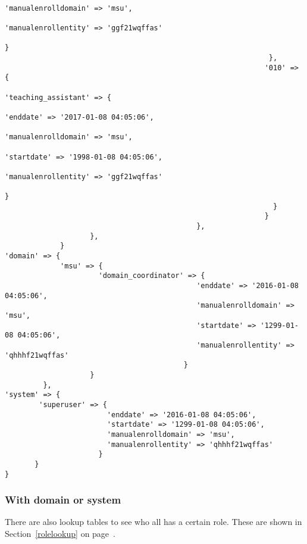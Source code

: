 \begin{verbatim}
                                                                  'manualenrolldomain' => 'msu',
                                                                  'manualenrollentity' => 'ggf21wqffas'
                                                                      }
                                                              },
                                                             '010' => {
                                                                'teaching_assistant' => {
                                                                  'enddate' => '2017-01-08 04:05:06',
                                                                  'manualenrolldomain' => 'msu',
                                                                  'startdate' => '1998-01-08 04:05:06',
                                                                  'manualenrollentity' => 'ggf21wqffas'
                                                                       }
                                                               }
                                                             }
                                             },
                    },
             }
'domain' => {
             'msu' => {
                      'domain_coordinator' => {
                                             'enddate' => '2016-01-08 04:05:06',
                                             'manualenrolldomain' => 'msu',
                                             'startdate' => '1299-01-08 04:05:06',
                                             'manualenrollentity' => 'qhhhf21wqffas'
                                          }
                    }
         },
'system' => {
        'superuser' => {
                        'enddate' => '2016-01-08 04:05:06',
                        'startdate' => '1299-01-08 04:05:06',
                        'manualenrolldomain' => 'msu',
                        'manualenrollentity' => 'qhhhf21wqffas'
                      }
       }
}
\end{verbatim}
\subsubsection{With domain or system}
There are also lookup tables to see who all has a certain role. These are shown in Section~\ref{rolelookup} on page~\pageref{rolelookup}.
